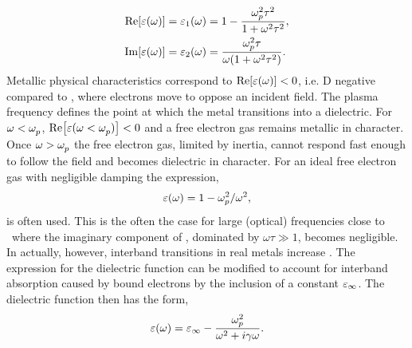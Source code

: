 \documentclass{article}
\begin{document}
\begin{subequations}
	\begin{align}
	\real{\dielectric} = \eps_1(\omega) &= 1 - \frac{\omegap[2]\tau^2}{1+\omega^2\tau^2},\\
	\imag{\dielectric} = \eps_2(\omega) &= \frac{\omegap[2]\tau}{\omega(1+\omega^2\tau^2)}.
	\end{align}
\end{subequations}
Metallic physical characteristics correspond to $\real{\dielectric}<0$, {\color{red}i.e. \gls{D} negative compared to }, where electrons move to oppose an incident field. The plasma frequency defines the point at which the metal transitions into a dielectric. For $\omega<\omegap$, $\real{\eps(\omega<\omegap)} < 0$ and a free electron gas remains metallic in character. Once $\omega > \omegap$ the free electron gas{\color{red}, limited by inertia,} cannot respond fast enough to follow the field and becomes dielectric in character.
For an ideal free electron gas with negligible damping the expression,
\begin{equation} \dielectric = 1 - \omegap[2]/\omega^2, \label{eq:dielectric_approx} \end{equation}
is often used. This is the often the case for large {\color{red}(optical)} frequencies close to \omegap\ where the imaginary component of \dielectric, dominated by $\omega\tau\gg 1$, becomes negligible. In actually, however, interband transitions in real metals increase \imag{\dielectric}.
The expression for the dielectric function can be modified to account for interband absorption caused by bound electrons by the inclusion of a constant $\eps_\infty$. The dielectric function then has the form,
\begin{equation}
	\dielectric = \eps_\infty - \frac{\omegap[2]}{\omega^2 + i\gamma\omega}.
	\label{eq:dielectric_function}
\end{equation}
\end{document}
